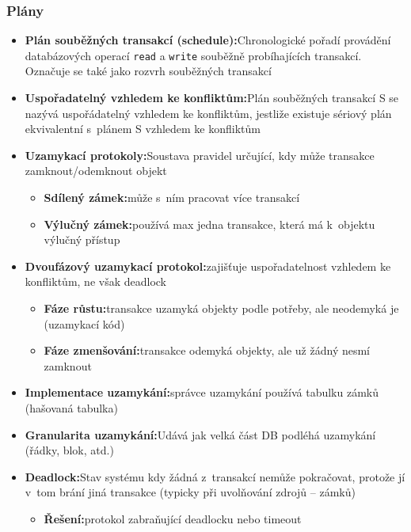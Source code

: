 \documentclass[a4paper,10pt]{article}
\newcommand{\pojem}[2]{\item \textbf{#1:}\quad #2}
\begin{document}
      \subsubsection{Plány}
        \begin{itemize}
          \pojem{Plán souběžných transakcí (schedule)}{Chronologické pořadí provádění databázových operací \texttt{read} a \texttt{write} souběžně probíhajících transakcí. Označuje se také jako rozvrh souběžných transakcí}

          \pojem{Uspořadatelný vzhledem ke konfliktům}{Plán souběžných transakcí S se nazývá uspořádatelný vzhledem ke konfliktům, jestliže existuje sériový plán ekvivalentní s~plánem S vzhledem ke konfliktům}

          \pojem{Uzamykací protokoly}{Soustava pravidel určující, kdy může transakce zamknout/odemknout objekt}
          \begin{itemize}
            \pojem{Sdílený zámek}{může s~ním pracovat více transakcí}
            \pojem{Výlučný zámek}{používá max jedna transakce, která má k~objektu výlučný přístup}
          \end{itemize}

          \pojem{Dvoufázový uzamykací protokol}{zajišťuje uspořadatelnost vzhledem ke konfliktům, ne však deadlock}
          \begin{itemize}
            \pojem{Fáze růstu}{transakce uzamyká objekty podle potřeby, ale neodemyká je (uzamykací kód)}
            \pojem{Fáze zmenšování}{transakce odemyká objekty, ale už žádný nesmí zamknout}
          \end{itemize}

          \pojem{Implementace uzamykání}{správce uzamykání používá tabulku zámků (hašovaná tabulka)}

          \pojem{Granularita uzamykání}{Udává jak velká část DB podléhá uzamykání (řádky, blok, atd.)}

          \pojem{Deadlock}{Stav systému kdy žádná z~transakcí nemůže pokračovat, protože jí v~tom brání jiná transakce (typicky při uvolňování zdrojů -- zámků)}
          \begin{itemize}
            \pojem{Řešení}{protokol zabraňující deadlocku nebo timeout}
          \end{itemize}
        \end{itemize}
\end{document}
